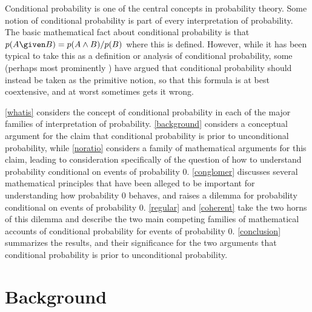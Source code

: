 
%


Conditional probability is one of the central concepts in probability theory. Some notion of conditional probability is part of every interpretation of probability. The basic mathematical fact about conditional probability is that $p(A \given B)=p(A\land B)/p(B)$ where this is defined. However, while it has been typical to take this as a definition or analysis of conditional probability, some (perhaps most prominently \citet{wcpcnb}) have argued that conditional probability should instead be taken as the primitive notion, so that this formula is at best coextensive, and at worst sometimes gets it wrong.

\autoref{whatis} considers the concept of conditional probability in each of the major families of interpretation of probability. \autoref{background} considers a conceptual argument for the claim that conditional probability is prior to unconditional probability, while \autoref{noratio} considers a family of mathematical arguments for this claim, leading to consideration specifically of the question of how to understand probability conditional on events of probability $0$. \autoref{conglomer} discusses several mathematical principles that have been alleged to be important for understanding how probability $0$ behaves, and raises a dilemma for probability conditional on events of probability $0$. \autoref{regular} and \autoref{coherent} take the two horns of this dilemma and describe the two main competing families of mathematical accounts of conditional probability for events of probability $0$. \autoref{conclusion} summarizes the results, and their significance for the two arguments that conditional probability is prior to unconditional probability.


\section{Background}

